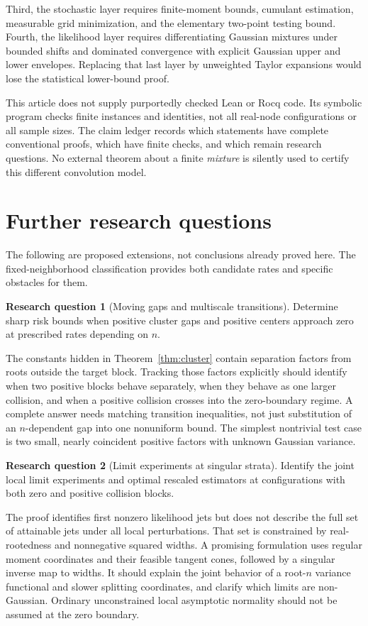 \documentclass[11pt,a4paper]{article}
\numberwithin{equation}{section}
\theoremstyle{definition}
\newtheorem{question}{Research question}
\theoremstyle{remark}
\begin{document}
Third, the stochastic layer requires finite-moment bounds, cumulant
estimation, measurable grid minimization, and the elementary two-point testing
bound. Fourth, the likelihood layer requires differentiating Gaussian mixtures
under bounded shifts and dominated convergence with explicit Gaussian
upper and lower envelopes. Replacing that last layer by unweighted Taylor
expansions would lose the statistical lower-bound proof.

This article does not supply purportedly checked Lean or Rocq code. Its
symbolic program checks finite instances and identities, not all real-node
configurations or all sample sizes. The claim ledger records which statements
have complete conventional proofs, which have finite checks, and which remain
research questions. No external theorem about a finite \emph{mixture} is silently
used to certify this different convolution model.

\section{Further research questions}
\label{sec:questions}

The following are proposed extensions, not conclusions already proved here.
The fixed-neighborhood classification provides both candidate rates and
specific obstacles for them.

\begin{question}[Moving gaps and multiscale transitions]
Determine sharp risk bounds when positive cluster gaps and positive centers
approach zero at prescribed rates depending on $n$.
\end{question}
The constants hidden in Theorem~\ref{thm:cluster} contain separation factors
from roots outside the target block. Tracking those factors explicitly should
identify when two positive blocks behave separately, when they behave as one
larger collision, and when a positive collision crosses into the zero-boundary
regime. A complete answer needs matching transition inequalities, not just
substitution of an $n$-dependent gap into one nonuniform bound. The simplest
nontrivial test case is two small, nearly coincident positive factors with
unknown Gaussian variance.

\begin{question}[Limit experiments at singular strata]
Identify the joint local limit experiments and optimal rescaled estimators
at configurations with both zero and positive collision blocks.
\end{question}
The proof identifies first nonzero likelihood jets but does not describe the
full set of attainable jets under all local perturbations. That set is
constrained by real-rootedness and nonnegative squared widths. A promising
formulation uses regular moment coordinates and their feasible tangent cones,
followed by a singular inverse map to widths. It should explain the joint
behavior of a root-$n$ variance functional and slower splitting coordinates,
and clarify which limits are non-Gaussian. Ordinary unconstrained local
asymptotic normality should not be assumed at the zero boundary.
\end{document}
